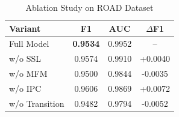 \begin{table}[t]
\centering
\caption{Ablation Study on ROAD Dataset}
\label{tab:ablation}
\small
\begin{tabular}{lccc}
\toprule
Variant & F1 & AUC & $\Delta$F1 \\
\midrule
Full Model & \textbf{0.9534} & 0.9952 & -- \\
w/o SSL & 0.9574 & 0.9910 & +0.0040 \\
w/o MFM & 0.9500 & 0.9844 & -0.0035 \\
w/o IPC & 0.9606 & 0.9869 & +0.0072 \\
w/o Transition & 0.9482 & 0.9794 & -0.0052 \\
\bottomrule
\end{tabular}
\end{table}